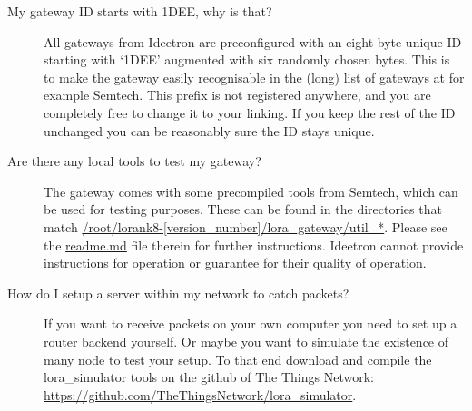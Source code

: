 \documentclass[12pt]{article}
\begin{document}
\begin{description}

\item[My gateway ID starts with 1DEE, why is that?] 
All gateways from Ideetron are preconfigured with an eight byte unique
ID starting with `1DEE' augmented with six randomly chosen bytes. This is 
to make the gateway easily recognisable in the (long) list of gateways at 
for example Semtech. This prefix is not registered anywhere, and you are 
completely free to change it to  your linking. If you keep the rest of 
the ID unchanged you can be reasonably sure the ID stays unique. 

\item[Are there any local tools to test my gateway?]
The gateway comes with some precompiled tools from Semtech, which
can be used for testing purposes. These can be found in the directories 
that match \url{/root/lorank8-[version_number]/lora_gateway/util_*}. Please see the
\url{readme.md} file therein for further instructions. Ideetron cannot provide
instructions for operation or guarantee for their quality of operation.

\item[How do I setup a server within my network to catch packets?]
If you want to receive packets on your own computer you need to set up
a router backend yourself. Or maybe you want to simulate the existence
of many node to test your setup. To that end download and compile the
lora\_simulator tools on the github of The Things Network:
\url{https://github.com/TheThingsNetwork/lora_simulator}.



\end{description}
\end{document}
